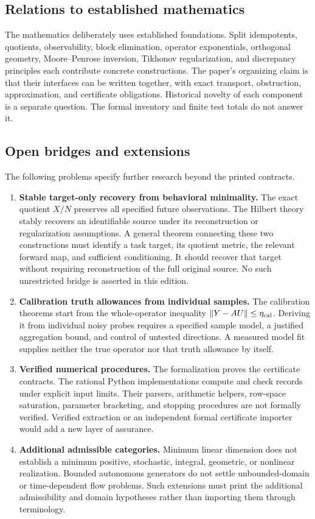 \documentclass[11pt]{article}
\theoremstyle{definition}\newtheorem{definition}[theorem]{Definition}
\theoremstyle{remark}\newtheorem{remark}[theorem]{Remark}
\newcommand{\nn}[1]{\left\lVert #1\right\rVert}
\begin{document}
\subsection{Relations to established mathematics}
The mathematics deliberately uses established foundations. Split idempotents,
quotients, observability, block elimination, operator exponentials, orthogonal
geometry, Moore--Penrose inversion, Tikhonov regularization, and discrepancy
principles each contribute concrete constructions. The paper's organizing
claim is that their interfaces can be written together, with exact
transport, obstruction, approximation, and certificate obligations.
Historical novelty of each component is a separate question. The formal
inventory and finite test totals do not answer it.

\subsection{Open bridges and extensions}
The following problems specify further research beyond the printed contracts.

\begin{enumerate}
\item \textbf{Stable target-only recovery from behavioral minimality.}
The exact quotient $X/N$ preserves all specified future observations.
The Hilbert theory stably recovers an identifiable source under its
reconstruction or regularization assumptions. A general theorem connecting
these two constructions must identify a task target, its quotient metric,
the relevant forward map, and sufficient conditioning. It should recover
that target without requiring reconstruction of the full original source.
No such unrestricted bridge is asserted in this edition.
\item \textbf{Calibration truth allowances from individual samples.}
The calibration theorems start from the whole-operator inequality
$\nn{Y-AU}\le\eta_{\rm cal}$. Deriving it from individual noisy probes
requires a specified sample model, a justified aggregation bound, and
control of untested directions. A measured model fit supplies neither
the true operator nor that truth allowance by itself.
\item \textbf{Verified numerical procedures.}
The formalization proves the certificate contracts. The rational Python
implementations compute and check records under explicit input limits.
Their parsers, arithmetic helpers, row-space saturation, parameter
bracketing, and stopping procedures are not formally verified.
Verified extraction or an independent formal certificate importer would
add a new layer of assurance.
\item \textbf{Additional admissible categories.}
Minimum linear dimension does not establish a minimum positive,
stochastic, integral, geometric, or nonlinear realization. Bounded
autonomous generators do not settle unbounded-domain or time-dependent
flow problems. Such extensions must print the additional admissibility
and domain hypotheses rather than importing them through terminology.
\end{enumerate}
\end{document}
